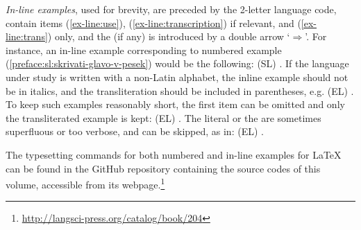 \documentclass[output=paper,modfonts,]{langscibook}
\begin{document}




\emph{In-line examples}, used for brevity, are preceded by the 2-letter language code, contain items (\ref{ex-line:use}), (\ref{ex-line:transcription}) if relevant, and (\ref{ex-line:trans}) only, and the  (if any) is introduced by a double arrow `$\Rightarrow$'. For instance, an in-line example corresponding to numbered example (\ref{preface:sl:skrivati-glavo-v-pesek}) would be the following: (SL) . 
%
If the language under study is written with a non-Latin alphabet, the inline example should not be in italics, and the transliteration should be included in parentheses, e.g. (EL) . To keep such examples reasonably short, the first item can be omitted and only the transliterated example is kept: (EL) . 
%
The literal or the  are sometimes superfluous or too verbose, and can be skipped, as in:  (EL) . 

The typesetting commands for both numbered and in-line examples for {\LaTeX} can be found in the GitHub repository containing the source codes of this volume, accessible from its webpage.\footnote{\url{http://langsci-press.org/catalog/book/204}} %

\end{document}
